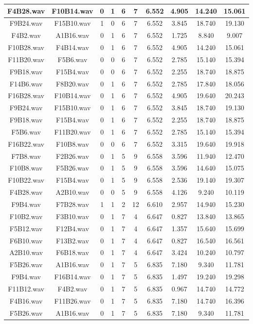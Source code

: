 \documentclass[11pt,a4paper]{book}
\begin{document}
\begin{longtable}[c]{|c|c|c|c|c|c|c|c|c|c|}
F4B28.wav&F10B14.wav&0&1&6&7&6.552&4.905&14.240&15.061\\ \hline
F9B24.wav&F15B10.wav&1&0&6&7&6.552&3.845&18.740&19.130\\ \hline
F4B2.wav&A1B16.wav&0&1&6&7&6.552&1.725&8.840&9.007\\ \hline
F10B28.wav&F4B14.wav&0&1&6&7&6.552&4.905&14.240&15.061\\ \hline
F11B20.wav&F5B6.wav&0&0&6&7&6.552&2.785&15.140&15.394\\ \hline
F9B18.wav&F15B4.wav&0&0&6&7&6.552&2.255&18.740&18.875\\ \hline
F14B6.wav&F8B20.wav&0&1&6&7&6.552&2.785&17.840&18.056\\ \hline
F16B28.wav&F10B14.wav&0&1&6&7&6.552&4.905&19.640&20.243\\ \hline
F9B24.wav&F15B10.wav&0&1&6&7&6.552&3.845&18.740&19.130\\ \hline
F9B18.wav&F15B4.wav&0&1&6&7&6.552&2.255&18.740&18.875\\ \hline
F5B6.wav&F11B20.wav&0&1&6&7&6.552&2.785&15.140&15.394\\ \hline
F16B22.wav&F10B8.wav&0&0&6&7&6.552&3.315&19.640&19.918\\ \hline
F7B8.wav&F2B26.wav&0&1&5&9&6.558&3.596&11.940&12.470\\ \hline
F10B8.wav&F5B26.wav&0&1&5&9&6.558&3.596&14.640&15.075\\ \hline
F10B22.wav&F15B4.wav&0&1&5&9&6.558&2.536&19.140&19.307\\ \hline
F4B28.wav&A2B10.wav&0&0&5&9&6.558&4.126&9.240&10.119\\ \hline
F9B4.wav&F7B28.wav&1&1&2&12&6.610&2.957&14.940&15.230\\ \hline
F10B2.wav&F3B10.wav&0&1&7&4&6.647&0.827&13.840&13.865\\ \hline
F5B12.wav&F12B4.wav&0&1&7&4&6.647&1.357&15.640&15.699\\ \hline
F6B10.wav&F13B2.wav&0&1&7&4&6.647&0.827&16.540&16.561\\ \hline
A2B10.wav&F6B18.wav&0&1&7&4&6.647&3.424&10.240&10.797\\ \hline
F5B26.wav&A1B16.wav&0&1&7&5&6.835&7.180&9.340&11.781\\ \hline
F9B4.wav&F16B14.wav&0&1&7&5&6.835&1.497&19.240&19.298\\ \hline
F11B12.wav&F4B2.wav&0&1&7&5&6.835&0.967&14.740&14.772\\ \hline
F4B16.wav&F11B26.wav&0&1&7&5&6.835&7.180&14.740&16.396\\ \hline
F5B26.wav&A1B16.wav&0&1&7&5&6.835&7.180&9.340&11.781\\ \hline

\end{longtable}
\end{document}
